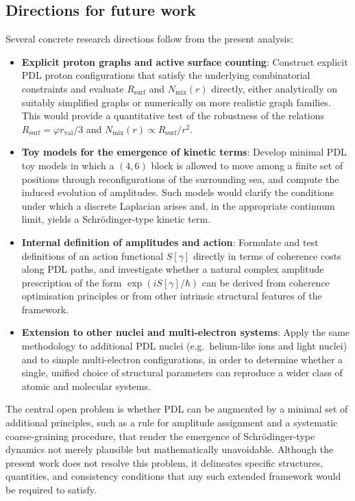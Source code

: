 \documentclass[11pt,a4paper]{article}
\begin{document}
\subsection{Directions for future work}

Several concrete research directions follow from the present analysis:
\begin{itemize}
\item \textbf{Explicit proton graphs and active surface counting}: Construct explicit PDL proton configurations that satisfy the underlying combinatorial constraints and evaluate $R_{\mathrm{surf}}$ and $N_{\mathrm{mix}}(r)$ directly, either analytically on suitably simplified graphs or numerically on more realistic graph families. This would provide a quantitative test of the robustness of the relations $R_{\mathrm{surf}}=\varphi r_{\mathrm{val}}/3$ and $N_{\mathrm{mix}}(r)\propto R_{\mathrm{surf}}/r^{2}$.
\item \textbf{Toy models for the emergence of kinetic terms}: Develop minimal PDL toy models in which a $(4,6)$ block is allowed to move among a finite set of positions through reconfigurations of the surrounding sea, and compute the induced evolution of amplitudes. Such models would clarify the conditions under which a discrete Laplacian arises and, in the appropriate continuum limit, yields a Schr\"odinger-type kinetic term.
\item \textbf{Internal definition of amplitudes and action}: Formulate and test definitions of an action functional $S[\gamma]$ directly in terms of coherence costs along PDL paths, and investigate whether a natural complex amplitude prescription of the form $\exp(iS[\gamma]/\hbar)$ can be derived from coherence optimisation principles or from other intrinsic structural features of the framework.
\item \textbf{Extension to other nuclei and multi-electron systems}: Apply the same methodology to additional PDL nuclei (e.g.\ helium-like ions and light nuclei) and to simple multi-electron configurations, in order to determine whether a single, unified choice of structural parameters can reproduce a wider class of atomic and molecular systems.
\end{itemize}
The central open problem is whether PDL can be augmented by a minimal set of additional principles, such as a rule for amplitude assignment and a systematic coarse-graining procedure, that render the emergence of Schr\"odinger-type dynamics not merely plausible but mathematically unavoidable. Although the present work does not resolve this problem, it delineates specific structures, quantities, and consistency conditions that any such extended framework would be required to satisfy.
\end{document}
